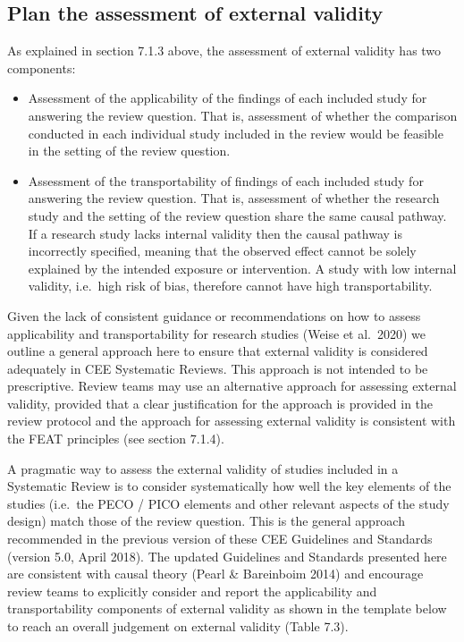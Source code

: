 \documentclass[
  letterpaper,
  DIV=11,
  numbers=noendperiod]{scrreprt}
\begin{document}
\subsection{Plan the assessment of external
validity}\label{plan-the-assessment-of-external-validity}

As explained in section 7.1.3 above, the assessment of external validity
has two components:

\begin{itemize}
\item
  Assessment of the applicability of the findings of each included study
  for answering the review question. That is, assessment of whether the
  comparison conducted in each individual study included in the review
  would be feasible in the setting of the review question.~
\item
  Assessment of the transportability of findings of each included study
  for answering the review question. That is, assessment of whether the
  research study and the setting of the review question share the same
  causal pathway. If a research study lacks internal validity then the
  causal pathway is incorrectly specified, meaning that the observed
  effect cannot be solely explained by the intended exposure or
  intervention. A study with low internal validity, i.e.~high risk of
  bias, therefore cannot have high transportability.
\end{itemize}

Given the lack of consistent guidance or recommendations on how to
assess applicability and transportability for research studies (Weise et
al.~2020) we outline a general approach here to ensure that external
validity is considered adequately in CEE Systematic Reviews. This
approach is not intended to be prescriptive. Review teams may use an
alternative approach for assessing external validity, provided that a
clear justification for the approach is provided in the review protocol
and the approach for assessing external validity is consistent with the
FEAT principles (see section 7.1.4).

A pragmatic way to assess the external validity of studies included in a
Systematic Review is to consider systematically how well the key
elements of the studies (i.e.~the PECO / PICO elements and other
relevant aspects of the study design) match those of the review
question. This is the general approach recommended in the previous
version of these CEE Guidelines and Standards (version 5.0, April 2018).
The updated Guidelines and Standards presented here are consistent with
causal theory (Pearl \& Bareinboim 2014) and encourage review teams to
explicitly consider and report the applicability and transportability
components of external validity as shown in the template below to reach
an overall judgement on external validity (Table 7.3).
\end{document}
